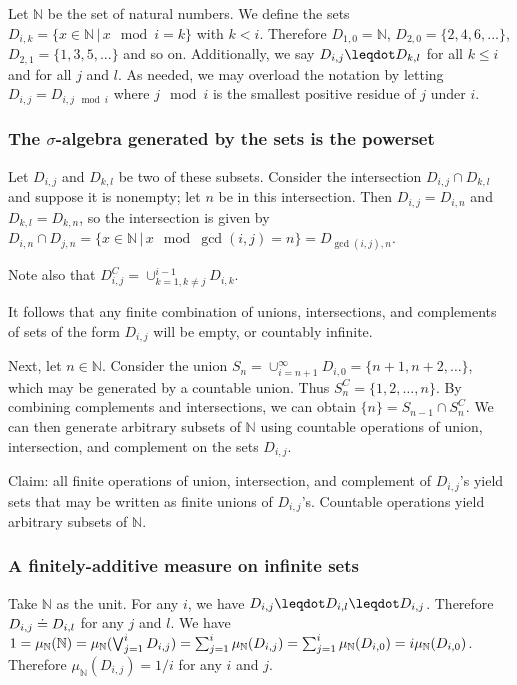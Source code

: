 \documentclass[10pt, onecolumn, nofootinbib]{revtex4-1}
\begin{document}
Let $\mathbb{N}$ be the set of natural numbers. We define the sets $D_{i,k} = \{ x \in \mathbb{N} \, | \, x \mod i = k \}$ with $k < i$. Therefore $D_{1,0} = \mathbb{N}$, $D_{2,0} = \{ 2, 4, 6, ... \}$, $D_{2,1} = \{ 1, 3, 5, ... \}$ and so on. Additionally, we say $D_{i,j} \finer D_{k,l}$ for all $k \leq i$ and for all $j$ and $l$. As needed, we may overload the notation by letting $D_{i,j} =  D_{i, j \mod i}$ where $j\mod i$ is the smallest positive residue of $j$ under $i$.

\subsubsection{The $\sigma$-algebra generated by the sets is the powerset}

Let $D_{i,j}$ and $D_{k,l}$ be two of these subsets. Consider the intersection $D_{i,j}\cap D_{k,l}$ and suppose it is nonempty; let $n$ be in this intersection. Then $D_{i,j} = D_{i,n}$ and $D_{k,l} = D_{k,n}$, so the intersection is given by $D_{i,n}\cap D_{j,n} = \{x\in \mathbb{N} \, | \, x \mod \gcd(i,j) = n\} = D_{\gcd(i,j),n}$. 

Note also that $D_{i,j}^C = \cup_{k=1,k\neq j}^{i-1}D_{i,k}$. 

It follows that any finite combination of unions, intersections, and complements of sets of the form $D_{i,j}$ will be empty, or countably infinite. 

Next, let $n\in\mathbb{N}$. Consider the union $S_n = \cup_{i=n+1}^{\infty}D_{i,0} = \{n+1,n+2,\ldots\}$, which may be generated by a countable union. Thus $S_n^C = \{1,2,\ldots,n\}$. By combining complements and intersections, we can obtain $\{n\} = S_{n-1}\cap S_n^C$. We can then generate arbitrary subsets of $\mathbb{N}$ using countable operations of union, intersection, and complement on the sets $D_{i,j}$. 

Claim: all finite operations of union, intersection, and complement of $D_{i,j}$'s yield sets that may be written as finite unions of $D_{i,j}$'s. Countable operations yield arbitrary subsets of $\mathbb{N}$. 

\subsubsection{A finitely-additive measure on infinite sets}

Take $\mathbb{N}$ as the unit. For any $i$, we have $D_{i,j} \finer D_{i,l} \finer D_{i,j}$. Therefore $D_{i,j} \doteq D_{i,l}$ for any $j$ and $l$. We have $1 = \mu_{\mathbb{N}}(\mathbb{N}) = \mu_{\mathbb{N}}(\bigvee_{j=1}^i D_{i,j}) = \sum_{j=1}^i \mu_{\mathbb{N}}( D_{i,j}) = \sum_{j=1}^i \mu_{\mathbb{N}}( D_{i,0}) = i \mu_{\mathbb{N}}( D_{i,0}) $. Therefore $\mu_{\mathbb{N}}( D_{i,j}) = 1/i$ for any $i$ and $j$.
\end{document}
